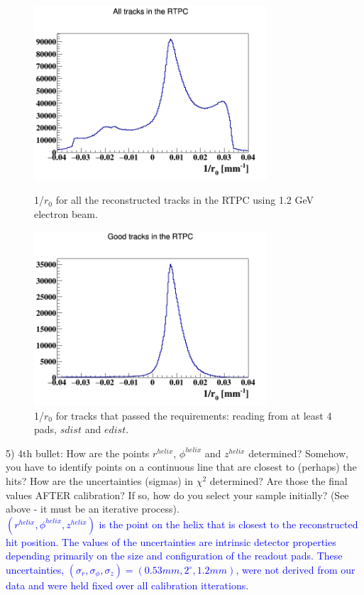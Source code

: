 \begin{figure}[tbp]
\hspace{-1cm}
\begin{minipage}[c]{.46\linewidth}
\includegraphics[height=6.5cm]{fig/rtpc_1overr0_all_before.png}
\caption{1/$r_{0}$ for all the reconstructed tracks in the RTPC using 1.2 GeV 
electron beam.}
\label{fig:1overr0}
\end{minipage} \hfill
\begin{minipage}[c]{.46\linewidth}
\hspace{-0.1in}\includegraphics[height=6.5cm]{fig/rtpc_1overr0_all.png}
\caption{1/$r_{0}$ for tracks that passed the requirements: reading from at 
least 4 pads, $sdist$ and $edist$.}
\label{fig:good_r0}
\end{minipage}
\end{figure}


5) 4th bullet: How are the points $r^{helix}$, $\phi^{helix}$ and $z^{helix}$ 
determined?  Somehow, you have to identify points on a continuous line that are 
closest to (perhaps) the hits? How are the uncertainties (sigmas) in  
$\chi^{2}$ determined?  Are those the final values AFTER calibration? If so, 
how do you select your sample initially? (See above - it must be an iterative 
process).  \\
\textcolor{blue}{$(r^{helix},\phi^{helix},z^{helix})$ is the point
on the helix that is closest to the reconstructed hit position.
The values of the uncertainties are intrinsic detector properties depending
primarily on the size and configuration of the readout pads. These 
uncertainties, $(\sigma_{r}, \sigma_{\phi}, \sigma_{z}) = (0.53 mm, 2^{\circ}, 
1.2 mm)$, were not derived from our data and were held fixed over all 
calibration itterations.} \\

